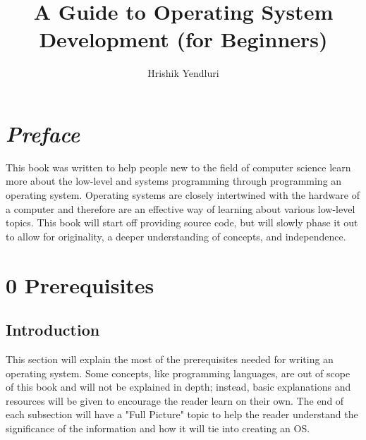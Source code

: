 \documentclass[openany, 12px]{book}
\title{\textbf{A Guide to Operating System Development (for Beginners)}}
\author{Hrishik Yendluri}
\date{}
\begin{document}
\fontsize{12pt}{18pt} \selectfont


\maketitle


\newpage
\tableofcontents
\clearpage


\newpage
\chapter*{\textit{Preface}}
This book was written to help people new to the field of computer science learn more about the low-level and systems programming through programming an operating system. Operating systems are closely intertwined with the hardware of a computer and therefore are an effective way of learning about various low-level topics. This book will start off providing source code, but will slowly phase it out to allow for originality, a deeper understanding of concepts, and independence.
\clearpage


\newpage
\chapter*{0 Prerequisites}
\setcounter{section}{-1}
\clearpage

\newpage
\section{Introduction}
This section will explain the most of the prerequisites needed for writing an operating system. Some concepts, like programming languages, are out of scope of this book and will not be explained in depth; instead, basic explanations and resources will be given to encourage the reader learn on their own. The end of each subsection will have a "Full Picture" topic to help the reader understand the significance of the information and how it will tie into creating an OS.
\end{document}
